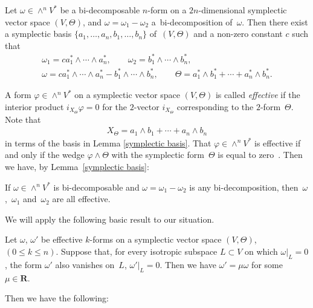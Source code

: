 \begin{Lem}
\label{symplectic basis}
Let $\omega \in \wedge^n V^*$ be a bi-decomposable $n$-form on
a $2n$-dimensional symplectic vector space $(V, \Theta)$, and
$\omega = \omega_1 - \omega_2$ a~bi-decomposition of~$\omega$.
Then there exist a symplectic basis
$\{ a_1,\dots, a_n, b_1,\dots, b_n\}$ of~$(V, \Theta)$
and a non-zero constant $c$ such that
\begin{gather*}
\omega_1  =
c  a_1^*\wedge \cdots \wedge a_n^*, \qquad
\omega_2  =   b_1^*\wedge \cdots \wedge b_n^*,
\\
\omega  =  c  a_1^*\wedge \cdots \wedge a_n^* -
b_1^*\wedge \cdots \wedge b_n^*,
\qquad
\Theta  =  a_1^* \wedge b_1^* + \cdots + a_n^* \wedge b_n^*.
\end{gather*}
\end{Lem}

A form $\varphi \in \wedge^n V^*$ on
a symplectic vector space $(V,\Theta)$
is called {\it effective} if
the interior product $i_{X_{\Theta}}\varphi = 0$ for
the $2$-vector $i_{X_{\Theta}}$ corresponding to the
$2$-form~$\Theta$.
Note that
\begin{gather*}
X_{\Theta} = a_1 \wedge b_1 + \cdots + a_n \wedge b_n
\end{gather*}
in terms of the basis in Lemma \ref{symplectic basis}.
That $\varphi \in \wedge^n V^*$ is ef\/fective if and only if
the wedge $\varphi\wedge\Theta$ with the symplectic form~$\Theta$ is equal to zero~\cite{B2, L}.
Then we have, by Lemma~\ref{symplectic basis}:

\begin{Cor}
\label{effective}
If $\omega \in \wedge^n V^*$ is bi-decomposable and
$\omega = \omega_1 - \omega_2$ is any bi-decomposition, then~$\omega$,~$\omega_1$ and~$\omega_2$ are all effective.
\end{Cor}

We will apply the following basic result to our situation.

\begin{Lem}\label{Lych}
Let $\omega$, $\omega'$ be effective $k$-forms on a symplectic vector space
$(V, \Theta)$, $(0\leq k\leq n)$.
Suppose that, for every isotropic subspace $L\subset V$ on which
$\omega\vert_L = 0$, the form $\omega'$ also vanishes on~$L$,
$\omega'\vert_L = 0$.
Then we have $\omega' =\mu{\omega}$ for some~$\mu \in {\mathbf{R}}$.
\end{Lem}

Then we have the following:

